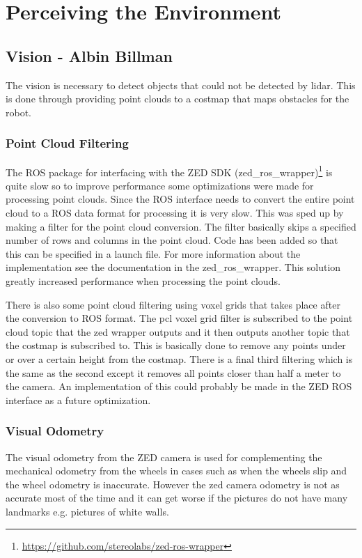 \section{Perceiving the Environment}
\subsection{Vision - Albin Billman}
\medskip

\noindent
The vision is necessary to detect objects that could not be detected by lidar. This is done through providing point clouds to a costmap that maps obstacles for the robot.

\subsubsection{Point Cloud Filtering}
\noindent
The ROS package for interfacing with the ZED SDK (zed\_ros\_wrapper)\footnote{\url{https://github.com/stereolabs/zed-ros-wrapper}} is quite slow so to improve performance some optimizations were made for processing point clouds. Since the ROS interface needs to convert the entire point cloud to a ROS data format for processing it is very slow. This was sped up by making a filter for the point cloud conversion. The filter basically skips a specified number of rows and columns in the point cloud. Code has been added so that this can be specified in a launch file. For more information about the implementation see the documentation in the zed\_ros\_wrapper. This solution greatly increased performance when processing the point clouds. 

There is also some point cloud filtering using voxel grids that takes place after the conversion to ROS format. The pcl voxel grid filter is subscribed to the point cloud topic that the zed wrapper outputs and it then outputs another topic that the costmap is subscribed to. This is basically done to remove any points under or over a certain height from the costmap. There is a final third filtering which is the same as the second except it removes all points closer than half a meter to the camera. An implementation of this could probably be made in the ZED ROS interface as a future optimization.

\subsubsection{Visual Odometry}
\noindent
The visual odometry from the ZED camera is used for complementing the mechanical odometry from the wheels in cases such as when the wheels slip and the wheel odometry is inaccurate. However the zed camera odometry is not as accurate most of the time and it can get worse if the pictures do not have many landmarks e.g. pictures of white walls.

